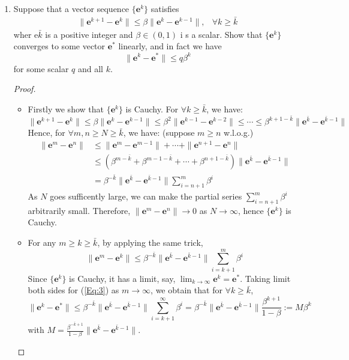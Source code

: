 \begin{enumerate}
\begin{proof}
\end{proof}
\item
Suppose that a vector sequence $\{\bm e^k\}$ satisfies
\[
\begin{array}{ll}
\|\bm e^{k+1} - \bm e^k\|\le\beta\|\bm e^k - \bm e^{k-1}\|,
&
\forall k\ge \bar k
\end{array}
\]
wher e$\bar k$ is a positive integer and $\beta\in(0,1)$ i s a scalar. Show that $\{\bm e^k\}$ converges to some vector $\bm e^*$ linearly, and in fact we have
\[
\|\bm e^k - \bm e^*\|\le q\beta^k
\]
for some scalar $q$ and all $k$.
\begin{proof}
\begin{itemize}
\item
Firstly we show that $\{\bm e^k\}$ is Cauchy. For $\forall k\ge \bar k$, we have:
\[
\|\bm e^{k+1} - \bm e^k\|\le\beta\|\bm e^k - \bm e^{k-1}\|
\le\beta^2\|\bm e^{k-1} - \bm e^{k-2}\|\le\cdots\le
\beta^{k+1-\bar k}\|\bm e^{\bar k} - \bm e^{\bar k-1}\|
\]
Hence, for $\forall m,n\ge N\ge \bar k$, we have: (suppose $m\ge n$ w.l.o.g.)
\begin{align*}
\|\bm e^m -\bm e^n\|&\le \|\bm e^{m} - \bm e^{m-1}\|+\cdots
+
\|\bm e^{n+1} - \bm e^n\|\\
&\le \left(\beta^{m - \bar k}+\beta^{m-1-\bar k}+\cdots+\beta^{n+1-\bar k}\right)\|\bm e^{\bar k} - \bm e^{\bar k - 1}\|\\
&=\beta^{-\bar k}\|\bm e^{\bar k} - \bm e^{\bar k - 1}\|\sum_{i=n+1}^{m}\beta^i
\end{align*}
As $N$ goes sufficently large, we can make the partial series $\sum_{i=n+1}^{m}\beta^i$ arbitrarily small. Therefore, $\|\bm e^m-\bm e^n\|\to0$ as $N\to\infty$, hence $\{\bm e^k\}$ is Cauchy.
\item
For any $m\ge k\ge \bar k$, by applying the same trick,
\begin{equation}\label{Eq:3}
\|\bm e^m - \bm e^k\|\le 
\beta^{-\bar k}\|\bm e^{\bar k} - \bm e^{\bar k - 1}\|\sum_{i=k+1}^{m}\beta^i
\end{equation}
Since $\{\bm e^k\}$ is Cauchy, it has a limit, say, $\lim_{k\to\infty}\bm e^k=\bm e^*$. Taking limit both sides for (\ref{Eq:3}) as $m\to\infty$, we obtain that for $\forall k\ge\bar k$,
\begin{equation}\label{Eq:4}
\|\bm e^k - \bm e^*\|\le 
\beta^{-\bar k}\|\bm e^{\bar k} - \bm e^{\bar k - 1}\|\sum_{i=k+1}^{\infty}\beta^i
=\beta^{-\bar k}\|\bm e^{\bar k} - \bm e^{\bar k - 1}\|
\frac{\beta^{k+1}}{1-\beta}
:=M\beta^k
\end{equation}
with $M=\frac{\beta^{-\bar k+1}}{1-\beta}\|\bm e^{\bar k} - \bm e^{\bar k - 1}\|$.


\end{itemize}
\end{proof}
\end{enumerate}
